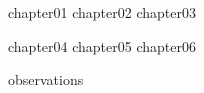 \documentclass[
bibfile=\ResourcePath./references
]{\ResourcePath./hunterthesis}
\begin{document}
\ThesisFrontmatter

{chapter01}
{chapter02}
{chapter03}
{chapter04}
{chapter05}
{chapter06}

\begin{ThesisBackmatter}
{observations}
\end{ThesisBackmatter}
\end{document}
